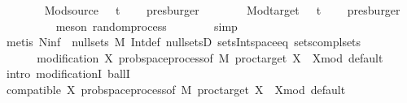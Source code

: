 \begin{isabellebody}
\ \ \ \ \ \ \isamarkupfalse%
\ Mod{\isacharunderscore}{\kern0pt}source\ {\isacartoucheopen}{}\ {\isacharless}{\kern0pt}\ {\isasymlfloor}t\ {\isacharplus}{\kern0pt}\ {}{\isasymrfloor}{\isacartoucheclose}\ \isamarkupfalse%
\ presburger\isanewline
\ \ \ \ \ \ \isamarkupfalse%
\ Mod{\isacharunderscore}{\kern0pt}target\ {\isacartoucheopen}{}\ {\isacharless}{\kern0pt}\ {\isasymlfloor}t\ {\isacharplus}{\kern0pt}\ {}{\isasymrfloor}{\isacartoucheclose}\ \isamarkupfalse%
\ presburger\isanewline
\ \ \ \ \ \ \ \ \isamarkupfalse%
\ {\isacharparenleft}{\kern0pt}meson\ random{\isacharunderscore}{\kern0pt}process{\isacharparenright}{\kern0pt}\isanewline
\ \ \ \ \ \ \isamarkupfalse%
\ simp\isanewline
\ \ \ \ \ \ \isamarkupfalse%
\ {\isacharparenleft}{\kern0pt}metis\ {\isacartoucheopen}N{\isacharunderscore}{\kern0pt}inf\ {\isasymin}\ null{\isacharunderscore}{\kern0pt}sets\ {\isacharquery}{\kern0pt}M{\isacartoucheclose}\ Int{\isacharunderscore}{\kern0pt}def\ null{\isacharunderscore}{\kern0pt}setsD{}\ sets{\isachardot}{\kern0pt}Int{\isacharunderscore}{\kern0pt}space{\isacharunderscore}{\kern0pt}eq{}\ sets{\isachardot}{\kern0pt}compl{\isacharunderscore}{\kern0pt}sets{\isacharparenright}{\kern0pt}\isanewline
\ \ \ \ \ \ \isamarkupfalse%
\isanewline
\ \ \isamarkupfalse%
\isanewline
\ \ \isamarkupfalse%
\ {\isachardoublequoteopen}modification\ X\ {\isacharparenleft}{\kern0pt}prob{\isacharunderscore}{\kern0pt}space{\isachardot}{\kern0pt}process{\isacharunderscore}{\kern0pt}of\ {\isacharquery}{\kern0pt}M\ {\isacharparenleft}{\kern0pt}proc{\isacharunderscore}{\kern0pt}target\ X{\isacharparenright}{\kern0pt}\ {\isacharbraceleft}{\kern0pt}{}{\isachardot}{\kern0pt}{\isachardot}{\kern0pt}{\isacharbraceright}{\kern0pt}\ X{\isacharunderscore}{\kern0pt}mod\ default{\isacharparenright}{\kern0pt}{\isachardoublequoteclose}\isanewline
\ \ \isamarkupfalse%
\ {\isacharparenleft}{\kern0pt}intro\ modificationI\ ballI{\isacharparenright}{\kern0pt}\isanewline
\ \ \ \ \isamarkupfalse%
\ {\isachardoublequoteopen}compatible\ X\ {\isacharparenleft}{\kern0pt}prob{\isacharunderscore}{\kern0pt}space{\isachardot}{\kern0pt}process{\isacharunderscore}{\kern0pt}of\ {\isacharquery}{\kern0pt}M\ {\isacharparenleft}{\kern0pt}proc{\isacharunderscore}{\kern0pt}target\ X{\isacharparenright}{\kern0pt}\ {\isacharbraceleft}{\kern0pt}{}{\isachardot}{\kern0pt}{\isachardot}{\kern0pt}{\isacharbraceright}{\kern0pt}\ X{\isacharunderscore}{\kern0pt}mod\ default{\isacharparenright}{\kern0pt}{\isachardoublequoteclose}\isanewline

\end{isabellebody}
